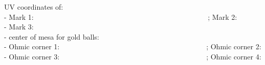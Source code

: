 UV coordinates of:\\

- Mark 1:~~~~~~~~~~~~~~~~~~~~~~~~~~~~~~~~~~~~~~~~~~~~~~~~ ; Mark 2: \\

- Mark 3:  \\

- center of mesa for gold balls: \\

- Ohmic corner 1:~~~~~~~~~~~~~~~~~~~~~~~~~~~~~~~~~~~~~~~~~; Ohmic corner 2:\\

- Ohmic corner 3:~~~~~~~~~~~~~~~~~~~~~~~~~~~~~~~~~~~~~~~~~; Ohmic corner 4:\\

\newpage

